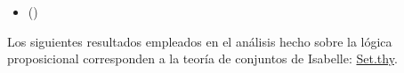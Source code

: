 \begin{isabellebody}
\begin{isamarkuptext}
  \begin{itemize}
    \item[]  
    \hfill ()
  \end{itemize}%
\end{isamarkuptext}\isamarkuptrue%
%
\isadelimdocument
%
\endisadelimdocument
%
\isatagdocument
%
\isamarkuptrue%
%
\endisatagdocument
{\isafolddocument}%
%
\isadelimdocument
%
\endisadelimdocument
%
\begin{isamarkuptext}%
Los siguientes resultados empleados en el análisis hecho sobre la lógica proposicional 
  corresponden a la teoría de conjuntos de Isabelle: \href{https://n9.cl/qatp}{Set.thy}.


\end{isamarkuptext}
\end{isabellebody}
